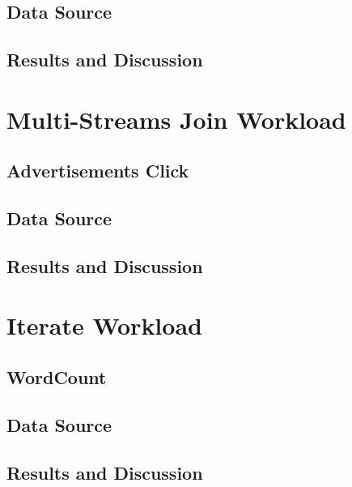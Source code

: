 \subsection{Data Source}
\subsection{Results and Discussion}

\section{Multi-Streams Join Workload}
\subsection{Advertisements Click}
\subsection{Data Source}
\subsection{Results and Discussion}

\section{Iterate Workload}
\subsection{WordCount}
\subsection{Data Source}
\subsection{Results and Discussion}

\clearpage